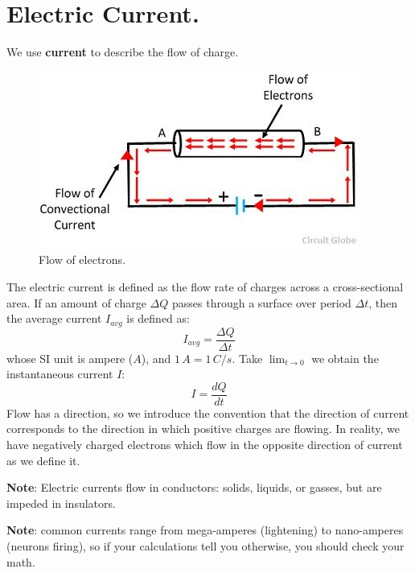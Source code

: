 \documentclass[11pt, letterpaper]{article}
\begin{document}
\section{Electric Current.}
	We use \textbf{current} to describe the flow of charge.
	\begin{figure}[h!]
		\centering
		\includegraphics[scale=0.5]{current.jpg}
		\caption{Flow of electrons.}
		\label{fig:current}
	\end{figure}
	
	The electric current is defined as the flow rate of charges across a cross-sectional area. If an amount of charge $\Delta Q$ passes through a surface over period $\Delta t$, then the average current $I_{avg}$ is defined as: \[I_{avg} = \frac{\Delta Q}{\Delta t}\] whose SI unit is ampere ($A$), and $1\, A = 1\, C/s$. Take $\lim_{t\to 0}$ we obtain the instantaneous current $I$: 
\begin{equation}\label{eqn:curr}
	\boxed{I = \frac{dQ}{dt}}
\end{equation}
Flow has a direction, so we introduce the convention that the direction of current corresponds to the direction in which positive charges are flowing. In reality, we have negatively charged electrons which flow in the opposite direction of current as we define it.

\textbf{Note}: Electric currents flow in conductors: solids, liquids, or gasses, but are impeded in insulators.

\textbf{Note}: common currents range from mega-amperes (lightening) to nano-amperes (neurons firing), so if your calculations tell you otherwise, you should check your math.
\end{document}
